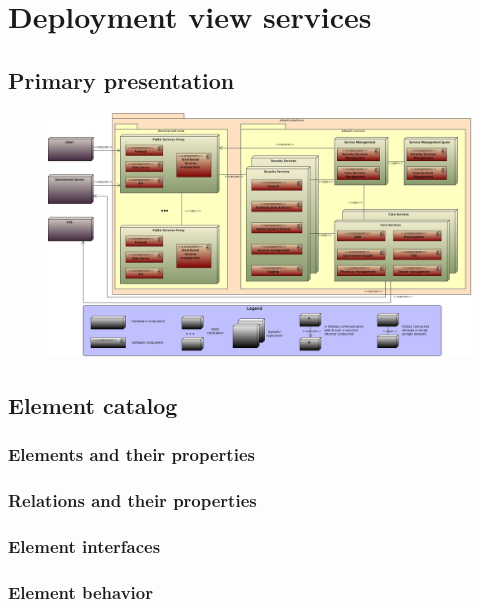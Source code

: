\documentclass[a4paper,10pt]{book}
\begin{document}
\section{Deployment view services}

\subsection{Primary presentation}
\begin{center}
    \begin{figure}
      \includegraphics[width=\textwidth]{../images/deployment_services.jpg}
    \end{figure}
  \end{center}

\subsection{Element catalog}

\subsubsection{Elements and their properties}

\subsubsection{Relations and their properties}

\subsubsection{Element interfaces}

\subsubsection{Element behavior}
\end{document}
